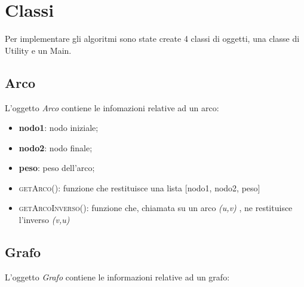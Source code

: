\section{Classi}
\label{Classi}

Per implementare gli algoritmi sono state create 4 classi di oggetti, una classe di Utility e un Main.

\subsection{Arco}
\label{Arco}

L'oggetto \textit{Arco} contiene le infomazioni relative ad un arco:

\begin{itemize}
    \item \textbf{nodo1}: nodo iniziale;
    \item \textbf{nodo2}: nodo finale;
    \item \textbf{peso}: peso dell'arco;
    \item \textsc{getArco()}: funzione che restituisce una lista [nodo1, nodo2, peso]
    \item \textsc{getArcoInverso()}: funzione che, chiamata su un arco \emph{(u,v)} , ne restituisce l'inverso \emph{(v,u)}
\end{itemize}


\subsection{Grafo}
\label{Grafo}

L'oggetto \textit{Grafo} contiene le informazioni relative ad un grafo:

